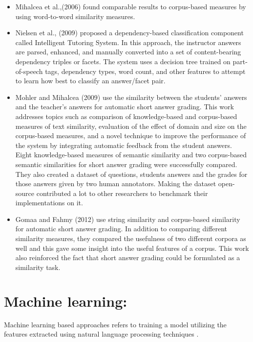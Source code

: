 \documentclass[rnd]{mas_proposal}
\begin{document}
\begin{itemize}
	\item Mihalcea et al.,(2006) \cite{Mihalcea2006} found comparable results to corpus-based measures by using word-to-word similarity measures.
	\item Nielsen et al., (2009) \cite{Nielsen2009}proposed a dependency-based classification component called Intelligent Tutoring System. In this approach, the instructor answers are parsed, enhanced, and manually converted into a set of content-bearing dependency triples or facets. The system uses a decision tree trained on part-of-speech tags, dependency types, word count, and other features to attempt to learn how best to classify an answer/facet pair.
	 \item Mohler and Mihalcea (2009) \cite{Mohler2009} use the similarity between the students’ answers and the teacher’s answers for automatic short answer grading. This work addresses topics such as comparison of knowledge-based and corpus-based measures of text similarity, evaluation of the effect of domain and size on the corpus-based measures, and a novel technique to improve the performance of the system by integrating automatic feedback from the student answers. Eight knowledge-based measures of semantic similarity and two corpus-based semantic similarities for short answer grading were successfully compared. They also created a dataset of questions, students answers and the grades for those answers given by two human annotators. Making the dataset open-source contributed a lot to other researchers to benchmark their implementations on it.
	 \item Gomaa and Fahmy (2012) \cite{Gomaa2012} use string similarity and corpus-based similarity for automatic short answer grading. In addition to comparing different similarity measures, they compared the usefulness of two different corpora as well and this gave some insight into the useful features of a corpus. This work also reinforced the fact that short answer grading could be formulated as a similarity task.
	 
	\end{itemize}

\section{Machine learning:}

Machine learning based approaches refers to training a model utilizing the features extracted using  natural language processing techniques \cite{Burrows2015}.
\end{document}
